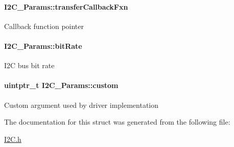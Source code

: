 \paragraph[{transfer\+Callback\+Fxn}]{ I2\+C\+\_\+\+Params\+::transfer\+Callback\+Fxn}\label{struct_i2_c___params_a57edf1b900368904779d0c57a73cf047}
Callback function pointer 
\paragraph[{bit\+Rate}]{ I2\+C\+\_\+\+Params\+::bit\+Rate}\label{struct_i2_c___params_ad31857f6dbedb77c60c92cc8cd8cde0c}
I2\+C bus bit rate 
\paragraph[{custom}]{\setlength{\rightskip}{0pt plus 5cm}uintptr\+\_\+t I2\+C\+\_\+\+Params\+::custom}\label{struct_i2_c___params_ac878e36550d6a22742b1a7bb71feb868}
Custom argument used by driver implementation 

The documentation for this struct was generated from the following file\+:\begin{DoxyCompactItemize}
\item 
\hyperlink{_i2_c_8h}{I2\+C.\+h}\end{DoxyCompactItemize}
